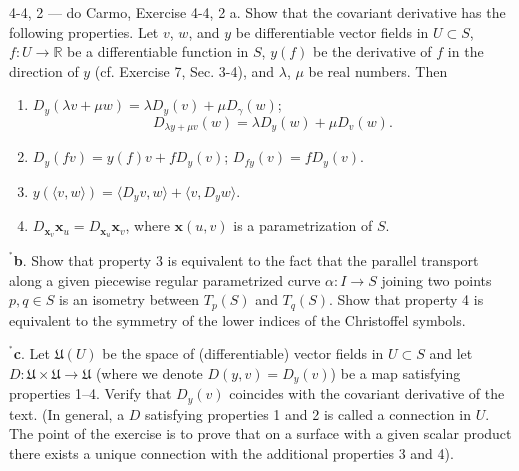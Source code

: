 \begin{exercise}{4-4, 2 — do Carmo, Exercise 4-4, 2}
a. Show that the covariant derivative has the following properties. Let $v$, $w$, and $y$ be differentiable vector fields in $U \subset S$, $f \colon U \to \mathbb{R}$ be a differentiable function in $S$, $y(f)$ be the derivative of $f$ in the direction of $y$ (cf. Exercise 7, Sec. 3-4), and $\lambda$, $\mu$ be real numbers. Then

\begin{enumerate}
\item $D_y(\lambda v + \mu w) = \lambda D_y(v) + \mu D_\gamma(w)$;
\[
D_{\lambda y + \mu v}(w) = \lambda D_y(w) + \mu D_v(w).
\]
\item $D_y(fv) = y(f)v + fD_y(v)$; $D_{fy}(v) = fD_y(v)$.
\item $y(\langle v,w\rangle) = \langle D_yv,w\rangle +\langle v,D_yw\rangle$.
\item $D_{\mathbf{x}_v}\mathbf{x}_u = D_{\mathbf{x}_u}\mathbf{x}_v$, where $\mathbf{x}(u,v)$ is a parametrization of $S$.
\end{enumerate}

$^{^*}$\textbf{b}. Show that property 3 is equivalent to the fact that the parallel transport along a given piecewise regular parametrized curve $\alpha \colon I \to S$ joining two points $p, q \in S$ is an isometry between $T_p(S)$ and $T_q(S)$. Show that property 4 is equivalent to the symmetry of the lower indices of the Christoffel symbols.

$^{^*}$\textbf{c}. Let $\mathfrak{U}(U)$ be the space of (differentiable) vector fields in $U\subset S$ and let $D\colon \mathfrak{U}\times \mathfrak{U}\to \mathfrak{U}$ (where we denote $D(y,v) = D_y(v)$) be a map satisfying properties 1--4. Verify that $D_y(v)$ coincides with the covariant derivative of the text. (In general, a $D$ satisfying properties 1 and 2 is called a connection in $U$. The point of the exercise is to prove that on a surface with a given scalar product there exists a unique connection with the additional properties 3 and 4).
\end{exercise}

